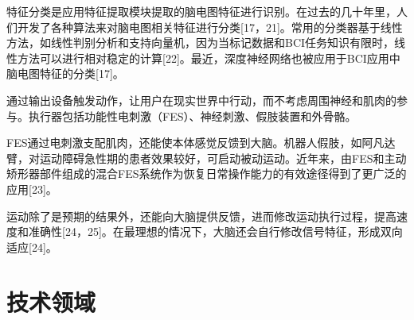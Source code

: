 \documentclass[UTF8,a4paper]{ctexart}
\begin{document}
\par
特征分类是应用特征提取模块提取的脑电图特征进行识别。在过去的几十年里，人们开发了各种算法来对脑电图相关特征进行分类[17，21]。常用的分类器基于线性方法，如线性判别分析和支持向量机，因为当标记数据和BCI任务知识有限时，线性方法可以进行相对稳定的计算[22]。最近，深度神经网络也被应用于BCI应用中脑电图特征的分类[17]。
\par
通过输出设备触发动作，让用户在现实世界中行动，而不考虑周围神经和肌肉的参与。执行器包括功能性电刺激（FES）、神经刺激、假肢装置和外骨骼。
\par
FES通过电刺激支配肌肉，还能使本体感觉反馈到大脑。机器人假肢，如阿凡达臂，对运动障碍急性期的患者效果较好，可启动被动运动。近年来，由FES和主动矫形器部件组成的混合FES系统作为恢复日常操作能力的有效途径得到了更广泛的应用[23]。
\par
运动除了是预期的结果外，还能向大脑提供反馈，进而修改运动执行过程，提高速度和准确性[24，25]。在最理想的情况下，大脑还会自行修改信号特征，形成双向适应[24]。
\section{技术领域}
\end{document}
